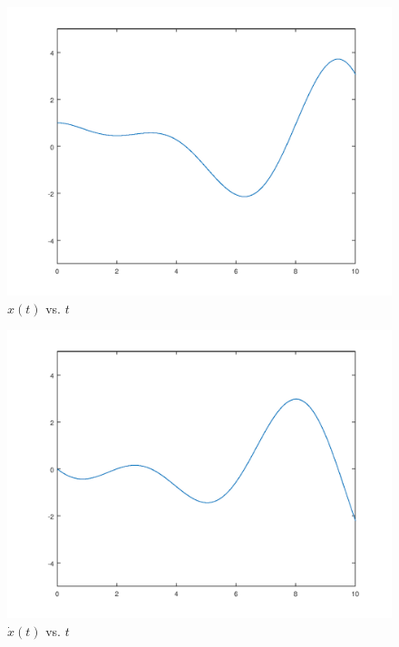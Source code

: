 \documentclass{article}
\begin{document}
\begin{figure}[h!]
\centering
\includegraphics[scale=0.5]{hw0_p1_1}
\caption{$x(t)$ vs. $t$}
\label{fig:universe}
\end{figure}
\begin{figure}[h!]
\centering
\includegraphics[scale=0.5]{hw0_p1_2}
\caption{$\dot x (t)$ vs. $t$}
\label{fig:universe}
\end{figure}
\begin{verbatim}












\end{verbatim}
\end{document}
